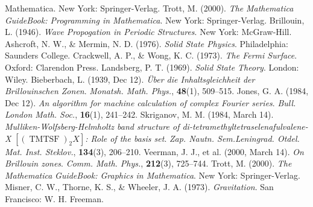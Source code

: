 \documentclass{article}
\begin{document}
\begin{thebibliography}{000}
{{Mathematica}}. New York: Springer-Verlag.\label{Trott00A}
 Trott, M. (2000). \textit{The }\textit{{\itshape
Mathematica}}\textit{ GuideBook: Programming in Mathematica}. New
York: Springer-Verlag.\label{Trott00}
 Brillouin, L. (1946). \textit{Wave Propogation
in Periodic Structures}. New York: McGraw-Hill.\label{Brillo}
 Ashcroft, N. W., \& Mermin, N. D. (1976). \textit{Solid
State Physics}. Philadelphia: Saunders College.\label{Ashcro76}
 Crackwell, A. P., \& Wong, K. C. (1973). \textit{The
Fermi Surface}. Oxford: Clarendon Press.\label{Crackw}
 Landsberg, P. T. (1969). \textit{Solid State Theory}.
London: Wiley.\label{Landsb}
 Bieberbach, L. (1939, Dec 12). \textit{\"Uber die
Inhaltsgleichheit der Brillouinschen Zonen}. \textit{Monatsh. Math.
Phys.}, \textbf{48}(1), 509--515.\label{Bieber}
 Jones, G. A. (1984, Dec 12). \textit{An algorithm
for machine calculation of complex Fourier series}. \textit{Bull.
London Math. Soc.}, \textbf{16}(1), 241--242.\label{Jones}
 Skriganov, M. M. (1984, March 14). \textit{Mulliken-Wolfsberg-Helmholtz
band structure of di-tetramethyltetraselenafulvalene-}\textit{{\itshape
X}}\textit{ }\textit{$[(\operatorname{TMTSF})_{2}X]$}\textit{: Role
of the basis set}. \textit{Zap. Nautn. Sem.Leningrad. Otdel. Mat.
Inst. Steklov.}, \textbf{134}(3), 206--210.\label{Skriga}
 Veerman, J. J., et al. (2000, March 14). \textit{On
Brillouin zones}. \textit{Comm. Math. Phys.}, \textbf{ 212}(3),
725--744.\label{Veerman}
 Trott, M. (2000). \textit{The }\textit{{\itshape
Mathematica}}\textit{ GuideBook: Graphics in Mathematica}. New York:
Springer-Verlag.\label{Trott00B}
 Misner, C. W., Thorne, K. S., \& Wheeler, J. A.
(1973). \textit{Gravitation}. San Francisco: W. H. Freeman.\label{Misner}
\end{thebibliography}
\end{document}

